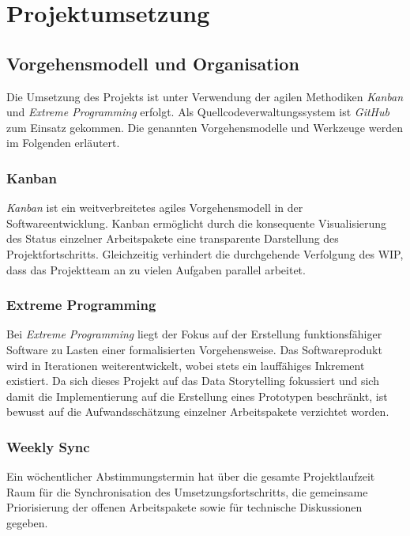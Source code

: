 \newpage

\section{Projektumsetzung}
\label{projektumsetzung}

\subsection{Vorgehensmodell und Organisation}
\label{Vorgehensmodelle_und_organisation}

Die Umsetzung des Projekts ist unter Verwendung der agilen Methodiken \emph{Kanban} und \emph{Extreme Programming} erfolgt. Als Quellcodeverwaltungssystem ist \emph{GitHub} zum Einsatz gekommen. Die genannten Vorgehensmodelle und Werkzeuge werden im Folgenden erläutert.

\subsubsection{Kanban}
\label{kanban}

\emph{Kanban} ist ein weitverbreitetes agiles Vorgehensmodell in der Softwareentwicklung. Kanban ermöglicht durch die konsequente Visualisierung des Status einzelner Arbeitspakete eine transparente Darstellung des Projektfortschritts. Gleichzeitig verhindert die durchgehende Verfolgung des \ac{WIP}, dass das Projektteam an zu vielen Aufgaben parallel arbeitet.

\subsubsection{Extreme Programming}
\label{extreme_programming}

Bei \emph{Extreme Programming} liegt der Fokus auf der Erstellung funktionsfähiger Software zu Lasten einer formalisierten Vorgehensweise. Das Softwareprodukt wird in Iterationen weiterentwickelt, wobei stets ein lauffähiges Inkrement existiert. Da sich dieses Projekt auf das Data Storytelling fokussiert und sich damit die Implementierung auf die Erstellung eines Prototypen beschränkt, ist bewusst auf die Aufwandsschätzung einzelner Arbeitspakete verzichtet worden.

\subsubsection{Weekly Sync}
\label{weekly_sync}

Ein wöchentlicher Abstimmungstermin hat über die gesamte Projektlaufzeit Raum für die Synchronisation des Umsetzungsfortschritts, die gemeinsame Priorisierung der offenen Arbeitspakete sowie für technische Diskussionen gegeben.

